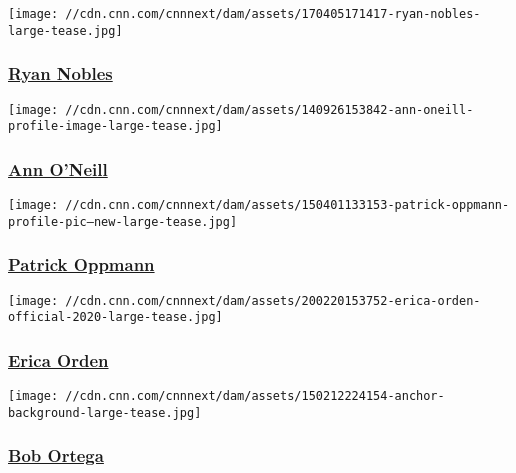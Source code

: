 \href{/profiles/ryan-nobles}{}

\texttt{[image: //cdn.cnn.com/cnnnext/dam/assets/170405171417-ryan-nobles-large-tease.jpg]}

\hypertarget{ryan-nobles}{%
\subsubsection{\texorpdfstring{\href{/profiles/ryan-nobles}{Ryan
Nobles}}{Ryan Nobles}}\label{ryan-nobles}}

\href{/profiles/ann-oneill}{}

\texttt{[image: //cdn.cnn.com/cnnnext/dam/assets/140926153842-ann-oneill-profile-image-large-tease.jpg]}

\hypertarget{ann-oneill}{%
\subsubsection{\texorpdfstring{\href{/profiles/ann-oneill}{Ann
O'Neill}}{Ann O'Neill}}\label{ann-oneill}}

\href{/profiles/patrick-oppmann-profile}{}

\texttt{[image: //cdn.cnn.com/cnnnext/dam/assets/150401133153-patrick-oppmann-profile-pic---new-large-tease.jpg]}

\hypertarget{patrick-oppmann}{%
\subsubsection{\texorpdfstring{\href{/profiles/patrick-oppmann-profile}{Patrick
Oppmann}}{Patrick Oppmann}}\label{patrick-oppmann}}

\href{/profiles/erica-orden}{}

\texttt{[image: //cdn.cnn.com/cnnnext/dam/assets/200220153752-erica-orden-official-2020-large-tease.jpg]}

\hypertarget{erica-orden}{%
\subsubsection{\texorpdfstring{\href{/profiles/erica-orden}{Erica
Orden}}{Erica Orden}}\label{erica-orden}}

\href{/profiles/bob-ortega}{}

\texttt{[image: //cdn.cnn.com/cnnnext/dam/assets/150212224154-anchor-background-large-tease.jpg]}

\hypertarget{bob-ortega}{%
\subsubsection{\texorpdfstring{\href{/profiles/bob-ortega}{Bob
Ortega}}{Bob Ortega}}\label{bob-ortega}}

